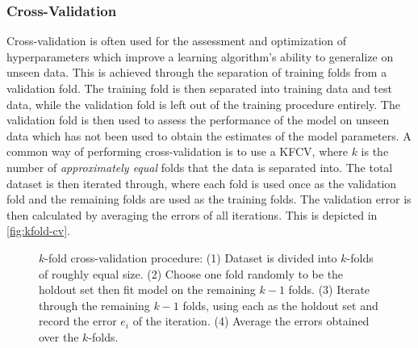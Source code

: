 

\subsubsection{Cross-Validation}
Cross-validation is often used for the assessment and optimization of
hyperparameters which improve a learning algorithm's ability to generalize on
unseen data. This is achieved through the separation of training folds from a
validation fold. The training fold is then separated into training data and
test data, while the validation fold is left out of the training procedure
entirely. The validation fold is then used to assess the performance of the
model on unseen data which has not been used to obtain the estimates of the
model parameters. A common way of performing cross-validation is to use a
\gls{KFCV}, where $k$ is the number of \textit{approximately
equal} folds that the data is separated into. The total dataset is then iterated
through, where each fold is used once as the validation fold and the remaining
folds are used as the training folds. The validation error is then calculated by
averaging the errors of all iterations. This is depicted in
\autoref{fig:kfold-cv}. \cite[p.~241-245]{hastie2009elements}


\begin{figure}[htbp]
    \centering
    
    \captionsetup{format=hang} %
    \caption{
        $k$-fold cross-validation procedure: (1) Dataset is divided into
        $k$-folds of roughly equal size. (2) Choose one fold randomly to be the
        holdout set then fit model on the remaining $k-1$ folds. (3) Iterate
        through the remaining $k-1$ folds, using each as the holdout set and
        record the error $e_i$ of the iteration. (4) Average the errors obtained
        over the $k$-folds.
    }
    \label{fig:kfold-cv}
\end{figure}

